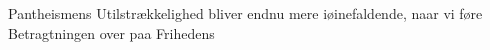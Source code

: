 \documentclass[12pt]{book}
\newcommand{\opage}[1]{\marginnote{\footnotesize\textit{[#1]}}}
\begin{document}
Pantheismens Utilstrækkelighed bliver endnu mere iøinefaldende, naar vi føre
Betragtningen over paa Frihedens
\opage{281} %
\end{document}
